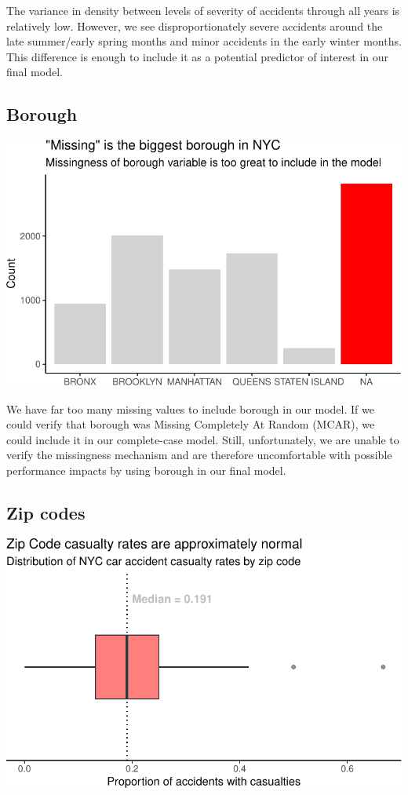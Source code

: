 \documentclass[
  letterpaper,
  DIV=11,
  numbers=noendperiod]{scrartcl}
\begin{document}
The variance in density between levels of severity of accidents through
all years is relatively low. However, we see disproportionately severe
accidents around the late summer/early spring months and minor accidents
in the early winter months. This difference is enough to include it as a
potential predictor of interest in our final model.

\hypertarget{borough}{%
\subsection{Borough}\label{borough}}

\includegraphics{project_files/figure-pdf/viz-hist-by-street-1.pdf}

We have far too many missing values to include borough in our model. If
we could verify that borough was Missing Completely At Random (MCAR), we
could include it in our complete-case model. Still, unfortunately, we
are unable to verify the missingness mechanism and are therefore
uncomfortable with possible performance impacts by using borough in our
final model.

\hypertarget{zip-codes}{%
\subsection{Zip codes}\label{zip-codes}}

\includegraphics{project_files/figure-pdf/viz-zip-code-box-1.pdf}
\end{document}
